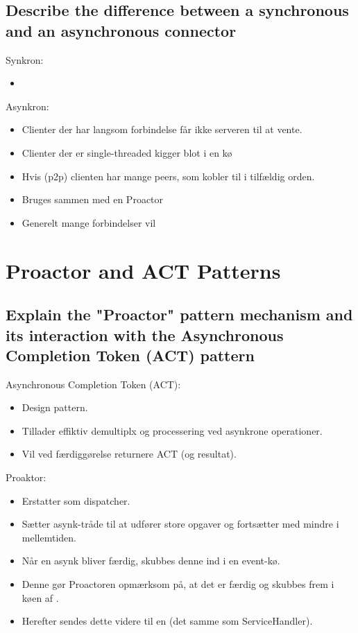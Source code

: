 \documentclass{article}
\begin{document}
\subsection{Describe the difference between a synchronous and an asynchronous connector}
Synkron:
\vspace{-10pt}
\begin{itemize}
	\item {}
\end{itemize}

Asynkron:
\vspace{-10pt}
\begin{itemize}
	\item Clienter der har langsom forbindelse får ikke serveren til at vente.
	\item Clienter der er single-threaded kigger blot i en kø 
	\item Hvis (p2p) clienten har mange peers, som kobler til i tilfældig orden.
	\item Bruges sammen med en Proactor
	\item Generelt mange forbindelser vil 
\end{itemize}







\newpage
\section{Proactor and ACT Patterns}

\subsection{Explain the "Proactor" pattern mechanism and its interaction with the  
Asynchronous Completion Token (ACT) pattern}

Asynchronous Completion Token (ACT):
\vspace{-10pt}
\begin{itemize}
	\item Design pattern.
	\item Tillader effiktiv demultiplx og processering ved asynkrone operationer.
	\item Vil ved færdiggørelse returnere ACT (og resultat).
\end{itemize}

Proaktor:
\vspace{-10pt}
\begin{itemize}
	\item Erstatter  som dispatcher.
	\item Sætter asynk-tråde til at udfører store opgaver og fortsætter med mindre i mellemtiden.
	\item Når en asynk bliver færdig, skubbes denne ind i en event-kø. 
	\item Denne gør Proactoren opmærksom på, at det er færdig og skubbes frem i køen af .
	\item Herefter sendes dette videre til en  (det samme som ServiceHandler).
\end{itemize}
\end{document}
